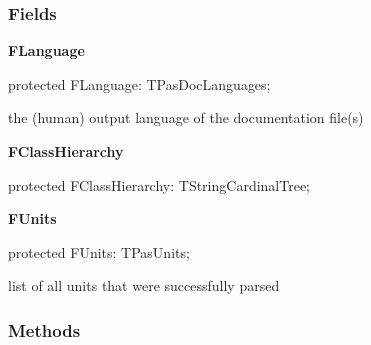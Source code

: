 \documentclass{report}
\newif\ifpdf
\begin{document}
\subsubsection*{\large{\textbf{Fields}}\normalsize\hspace{1ex}\hfill}
\begin{list}{}{
\setlength{\itemindent}{0cm}
\setlength{\listparindent}{0cm}
\setlength{\leftmargin}{\evensidemargin}
\addtolength{\leftmargin}{\tmplength}
\settowidth{\labelsep}{X}
\addtolength{\leftmargin}{\labelsep}
\setlength{\labelwidth}{\tmplength}
}
\label{PasDoc_Gen.TDocGenerator-FLanguage}
\item[\textbf{FLanguage}\hfill]
\ifpdf
\begin{flushleft}
\fi
\begin{ttfamily}
protected FLanguage: TPasDocLanguages;\end{ttfamily}

\ifpdf
\end{flushleft}
\fi


\par the (human) output language of the documentation file(s)\label{PasDoc_Gen.TDocGenerator-FClassHierarchy}
\item[\textbf{FClassHierarchy}\hfill]
\ifpdf
\begin{flushleft}
\fi
\begin{ttfamily}
protected FClassHierarchy: TStringCardinalTree;\end{ttfamily}

\ifpdf
\end{flushleft}
\fi


\par  \label{PasDoc_Gen.TDocGenerator-FUnits}
\item[\textbf{FUnits}\hfill]
\ifpdf
\begin{flushleft}
\fi
\begin{ttfamily}
protected FUnits: TPasUnits;\end{ttfamily}

\ifpdf
\end{flushleft}
\fi


\par list of all units that were successfully parsed\end{list}
\subsubsection*{\large{\textbf{Methods}}\normalsize\hspace{1ex}\hfill}
\end{document}
